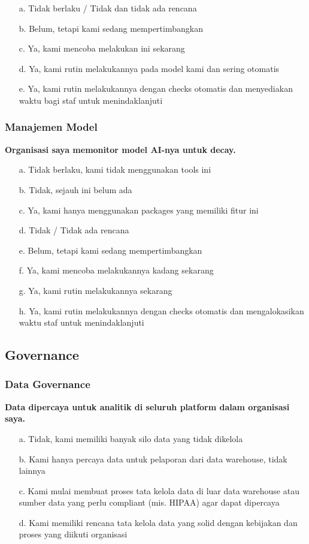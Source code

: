 \documentclass{article}
\begin{document}
\begin{enumerate}
	\item[a.] Tidak berlaku / Tidak dan tidak ada rencana
	\item[b.] Belum, tetapi kami sedang mempertimbangkan
	\item[c.] Ya, kami mencoba melakukan ini sekarang
	\item[d.] Ya, kami rutin melakukannya pada model kami dan sering otomatis
	\item[e.] Ya, kami rutin melakukannya dengan checks otomatis dan menyediakan waktu bagi staf untuk menindaklanjuti
\end{enumerate}

\subsubsection{Manajemen Model}

\textbf{Organisasi saya memonitor model AI-nya untuk decay.}

\begin{enumerate}
	\item[a.] Tidak berlaku, kami tidak menggunakan tools ini
	\item[b.] Tidak, sejauh ini belum ada
	\item[c.] Ya, kami hanya menggunakan packages yang memiliki fitur ini
	\item[d.] Tidak / Tidak ada rencana
	\item[e.] Belum, tetapi kami sedang mempertimbangkan
	\item[f.] Ya, kami mencoba melakukannya kadang sekarang
	\item[g.] Ya, kami rutin melakukannya sekarang
	\item[h.] Ya, kami rutin melakukannya dengan checks otomatis dan mengalokasikan waktu staf untuk menindaklanjuti
\end{enumerate}


\subsection{Governance}

\subsubsection{Data Governance}

\textbf{Data dipercaya untuk analitik di seluruh platform dalam organisasi saya.}

\begin{enumerate}
	\item[a.] Tidak, kami memiliki banyak silo data yang tidak dikelola
	\item[b.] Kami hanya percaya data untuk pelaporan dari data warehouse, tidak lainnya
	\item[c.] Kami mulai membuat proses tata kelola data di luar data warehouse atau sumber data yang perlu compliant (mis. HIPAA) agar dapat dipercaya
	\item[d.] Kami memiliki rencana tata kelola data yang solid dengan kebijakan dan proses yang diikuti organisasi
\end{enumerate}
\end{document}
